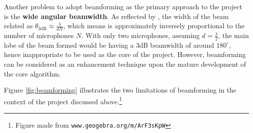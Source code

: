 \documentclass[a4paper,twoside,12pt,hidelinks]{article}
\begin{document}
Another problem to adopt beamforming as the primary approach to the project is the \textbf{wide angular beamwidth}. As reflected by \cite{Rabinovich2013TypicalMethods}, the width of the beam related as $\theta_{\text{3dB}} \approx \frac{\lambda}{dN}$, which means is approximately inversely proportional to the number of microphones $N$. With only two microphones, assuming $d=\frac{\lambda}{2}$, the main lobe of the beam formed would be having a 3dB beamwidth of around $180^\circ$, hence inappropriate to be used as the core of the project. However, beamforming can be considered as an enhancement technique upon the mature development of the core algorithm.

Figure \ref{fig:beamforming} illustrates the two limitations of beamforming in the context of the project discussed above.\footnote{Figure made from \texttt{www.geogebra.org/m/ArF3sKpW}}
\end{document}
